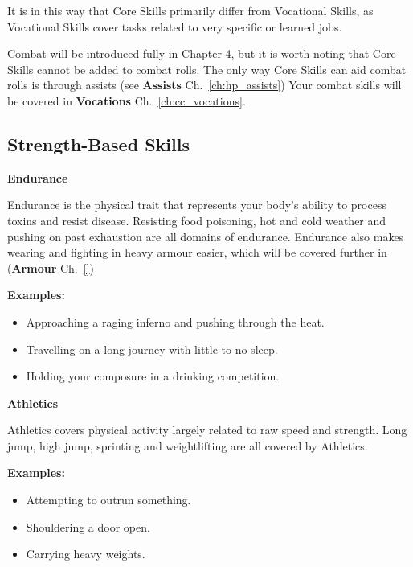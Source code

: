 It is in this way that Core Skills primarily differ from Vocational Skills, as Vocational Skills cover tasks related to very specific or learned jobs.

Combat will be introduced fully in Chapter 4, but it is worth noting that Core Skills cannot be added to combat rolls. The only way Core Skills can aid combat rolls is through assists (see \textbf{Assists} Ch.~\ref{ch:hp_assists}) Your combat skills will be covered in \textbf{Vocations} Ch.~\ref{ch:cc_vocations}.

\subsection{Strength-Based Skills} \label{subsec:strength_based_skills}

\textbf{Endurance}

Endurance is the physical trait that represents your body’s ability to process toxins and resist disease. Resisting food poisoning, hot and cold weather and pushing on past exhaustion are all domains of endurance. Endurance also makes wearing and fighting in heavy armour easier, which will be covered further in (\textbf{Armour} Ch.~\ref{}) %

\begin{displayquote}
    \textbf{Examples:}
    \begin{itemize}
        \item Approaching a raging inferno and pushing through the heat.
        \item Travelling on a long journey with little to no sleep.
        \item Holding your composure in a drinking competition.
    \end{itemize}
\end{displayquote}

\textbf{Athletics}

Athletics covers physical activity largely related to raw speed and strength. Long jump, high jump, sprinting and weightlifting are all covered by Athletics.

\begin{displayquote}
    \textbf{Examples:}
    \begin{itemize}
        \item Attempting to outrun something.
        \item Shouldering a door open.
        \item Carrying heavy weights.
    \end{itemize}
\end{displayquote}

